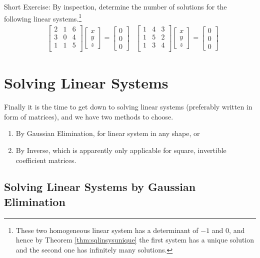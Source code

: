 Short Exercise: By inspection, determine the number of solutions for the following linear systems.\footnote{These two homogeneous linear system has a determinant of $-1$ and $0$, and hence by Theorem \ref{thm:sqlinsysunique} the first system has a unique solution and the second one has infinitely many solutions.}
\begin{align*}
&
\begin{bmatrix}
2 & 1 & 6 \\
3 & 0 & 4 \\
1 & 1 & 5 \\
\end{bmatrix}
\begin{bmatrix}
x \\
y \\
z
\end{bmatrix}
=
\begin{bmatrix}
0 \\
0 \\
0
\end{bmatrix}
&
\begin{bmatrix}
1 & 4 & 3 \\
1 & 5 & 2 \\
1 & 3 & 4 \\
\end{bmatrix}
\begin{bmatrix}
x \\
y \\
z
\end{bmatrix}
=
\begin{bmatrix}
0 \\
0 \\
0
\end{bmatrix}
\end{align*}

\section{Solving Linear Systems}
Finally it is the time to get down to solving linear systems (preferably written in form of matrices), and we have two methods to choose.
\begin{enumerate}
\item By Gaussian Elimination, for linear system in any shape, or
\item By Inverse, which is apparently only applicable for square, invertible coefficient matrices.
\end{enumerate}

\subsection{Solving Linear Systems by Gaussian Elimination}
\label{subsection:SolLinSysGauss}

